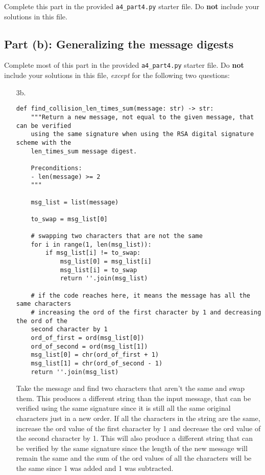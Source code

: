 \documentclass[11pt]{article}
\begin{document}
Complete this part in the provided \texttt{a4\_part4.py} starter file.
Do \textbf{not} include your solutions in this file.

\subsection*{Part (b): Generalizing the message digests}

Complete most of this part in the provided \texttt{a4\_part4.py} starter file.
Do \textbf{not} include your solutions in this file, \emph{except} for the following two questions:

\begin{enumerate}

\item[3b.]

\begin{verbatim}
def find_collision_len_times_sum(message: str) -> str:
    """Return a new message, not equal to the given message, that can be verified
    using the same signature when using the RSA digital signature scheme with the
    len_times_sum message digest.

    Preconditions:
    - len(message) >= 2
    """

    msg_list = list(message)

    to_swap = msg_list[0]

    # swapping two characters that are not the same
    for i in range(1, len(msg_list)):
        if msg_list[i] != to_swap:
            msg_list[0] = msg_list[i]
            msg_list[i] = to_swap
            return ''.join(msg_list)

    # if the code reaches here, it means the message has all the same characters
    # increasing the ord of the first character by 1 and decreasing the ord of the
    second character by 1
    ord_of_first = ord(msg_list[0])
    ord_of_second = ord(msg_list[1])
    msg_list[0] = chr(ord_of_first + 1)
    msg_list[1] = chr(ord_of_second - 1)
    return ''.join(msg_list)

\end{verbatim}

Take the message and find two characters that aren't the same and swap them. This produces a different string than the input message, that can be verified using the same signature since it is still all the same original characters just in a new order. If all the characters in the string are the same, increase the ord value of the first character by 1 and decrease the ord value of the second character by 1. This will also produce a different string that can be verified by the same signature since the length of the new message will remain the same and the sum of the ord values of all the characters will be the same since 1 was added and 1 was subtracted.


\end{enumerate}
\end{document}
